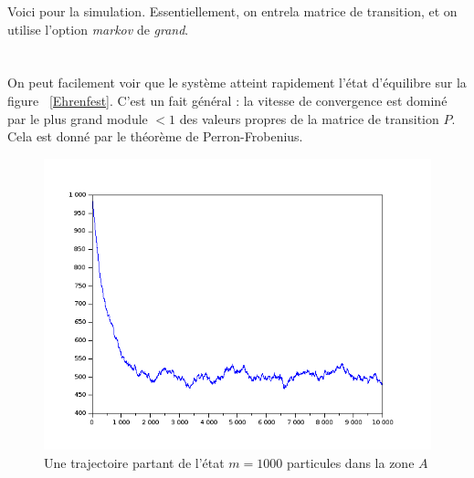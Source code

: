 Voici pour la simulation. Essentiellement, on entrela matrice de transition, et on utilise l'option \textit{markov} de \textit{grand}.\\

\\
\\

On peut facilement voir que le système atteint rapidement l'état d'équilibre sur la figure ~\ref{Ehrenfest}. C'est un fait général : la vitesse de convergence est dominé par le plus grand module $<1$ des valeurs propres de la matrice de transition $P$. Cela est donné par le théorème de Perron-Frobenius.

\begin{figure}[h]\centering
\includegraphics[scale=0.4]{Ehrenfest.png}
\caption{Une trajectoire partant de l'état $m=1000$ particules dans la zone $A$}
\label{fig:Ehrenfest}
\end{figure}









